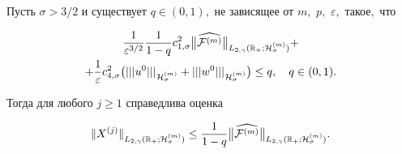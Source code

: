 \begin{theorem}[4]Пусть $\sigma>3/2$ и существует $q\in(0, 1),$ не зависящее от $m,$ $p,$ $\varepsilon,$ такое$,$ что

\begin{multline}

\frac{1}{\varepsilon^{3/2}}\frac{1}{1-q}c^2_{1,\sigma}

\bigl\|\widehat{{\cal F}^{(m)}} 

\bigr\|_{L_{2,\gamma}(\mathbb R_{+};{\cal H}^{(m)}_{\sigma})}+

\\

+\frac{1}{\varepsilon}c^2_{4,\sigma}\bigl(|||u^0|||_{{\cal H}^{(m)}_\sigma}+|||w^0|||_{{\cal H}^{(m)}_\sigma}\bigr)\le q,\quad  q\in(0, 1).

\end{multline}

Тогда для любого $j\ge 1$ справедлива оценка

$$

\|X^{(j)}\|_{L_{2,\gamma}(\mathbb R_{+};{\cal H}^{(m)}_{\sigma})} \le \frac{1}{1-q}

\bigl\| \widehat{{\cal F}^{(m)}} \bigr\|_{L_{2,\gamma}(\mathbb R_{+};{\cal H}^{(m)}_{\sigma})}.

$$

\end{theorem}



\smallskip








